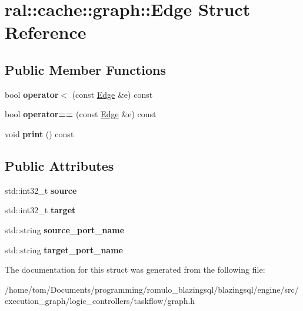 \hypertarget{structral_1_1cache_1_1graph_1_1Edge}{}\section{ral\+:\+:cache\+:\+:graph\+:\+:Edge Struct Reference}
\label{structral_1_1cache_1_1graph_1_1Edge}
\subsection*{Public Member Functions}
\begin{DoxyCompactItemize}
\item 
\mbox{\label{structral_1_1cache_1_1graph_1_1Edge_abdd097e719806177f684116ed62b6c32}} 
bool {\bfseries operator$<$} (const \hyperlink{structral_1_1cache_1_1graph_1_1Edge}{Edge} \&e) const
\item 
\mbox{\label{structral_1_1cache_1_1graph_1_1Edge_a1f5da6f33f1791f7033f3339865bbdb9}} 
bool {\bfseries operator==} (const \hyperlink{structral_1_1cache_1_1graph_1_1Edge}{Edge} \&e) const
\item 
\mbox{\label{structral_1_1cache_1_1graph_1_1Edge_a3106a87b778cb9673ebf1bd1db122d52}} 
void {\bfseries print} () const
\end{DoxyCompactItemize}
\subsection*{Public Attributes}
\begin{DoxyCompactItemize}
\item 
\mbox{\label{structral_1_1cache_1_1graph_1_1Edge_a8dc9ddc349aa516a43e79ca54b103280}} 
std\+::int32\+\_\+t {\bfseries source}
\item 
\mbox{\label{structral_1_1cache_1_1graph_1_1Edge_a68ae521d03065a14e421f2051802e042}} 
std\+::int32\+\_\+t {\bfseries target}
\item 
\mbox{\label{structral_1_1cache_1_1graph_1_1Edge_a35e5d15b7612e9622f1708b10a5d6cf4}} 
std\+::string {\bfseries source\+\_\+port\+\_\+name}
\item 
\mbox{\label{structral_1_1cache_1_1graph_1_1Edge_acdf77070b3fec68b021b6ccc0962c060}} 
std\+::string {\bfseries target\+\_\+port\+\_\+name}
\end{DoxyCompactItemize}


The documentation for this struct was generated from the following file\+:\begin{DoxyCompactItemize}
\item 
/home/tom/\+Documents/programming/romulo\+\_\+blazingsql/blazingsql/engine/src/execution\+\_\+graph/logic\+\_\+controllers/taskflow/graph.\+h\end{DoxyCompactItemize}
